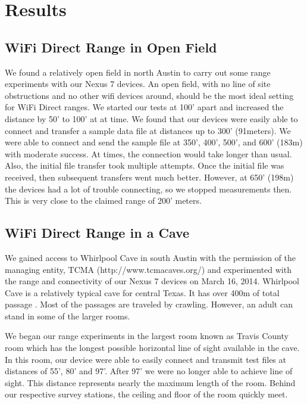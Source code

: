\documentclass[10pt,twocolumn]{article}
\begin{document}
\section{Results}

\subsection{WiFi Direct Range in Open Field}
\label{sec:WiFi Direct Range in Open Field}
We found a relatively open field in north Austin to carry out some range experiments with our Nexus 7 devices.
An open field, with no line of site obstructions and no other wifi devices around, should be the most ideal setting for WiFi Direct ranges.
We started our tests at 100' apart and increased the distance by 50' to 100' at at time.
We found that our devices were easily able to connect and transfer a sample data file at distances up to 300' (91meters). 
We were able to connect and send the sample file at 350', 400', 500', and 600' (183m) with moderate success. 
At times, the connection would take longer than usual.
Also, the initial file transfer took multiple attempts.
Once the initial file was received, then subsequent transfers went much better.
However, at 650' (198m) the devices had a lot of trouble connecting, so we stopped measurements then.
This is very close to the claimed range of 200' meters.

\subsection{WiFi Direct Range in a Cave}
\label{sec:WiFi Direct Range in a Cave}
We gained access to Whirlpool Cave in south Austin with the permission of the managing entity, TCMA (http://www.tcmacaves.org/) and experimented with the range and connectivity of our Nexus 7 devices on March 16, 2014.
Whirlpool Cave is a relatively typical cave for central Texas.
It has over 400m of total passage \cite{whirlpool}. 
Most of the passages are traveled by crawling.
However, an adult can stand in some of the larger rooms.

We began our range experiments in the largest room known as Travis County room which has the longest possible horizontal line of sight available in the cave.
In this room, our device were able to easily connect and transmit test files at distances of 55', 80' and 97'. 
After 97' we were no longer able to achieve line of sight.
This distance represents nearly the maximum length of the room. 
Behind our respective survey stations, the ceiling and floor of the room quickly meet.
\end{document}
